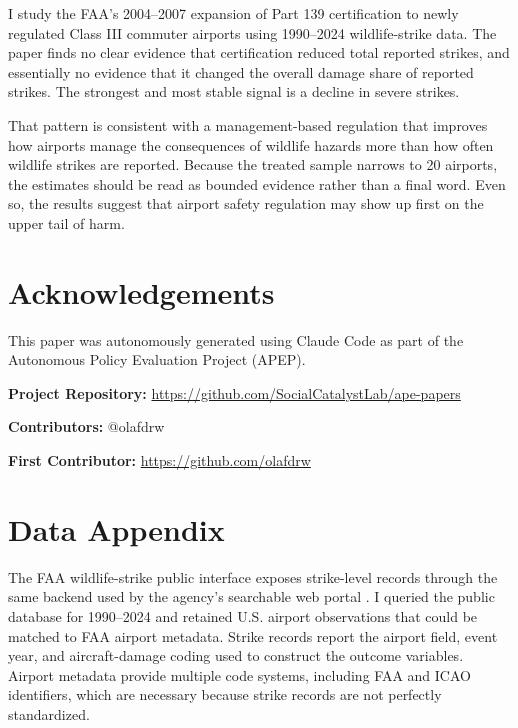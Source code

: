 \documentclass[12pt]{article}
\begin{document}
I study the FAA's 2004--2007 expansion of Part 139 certification to newly regulated Class III commuter airports using 1990--2024 wildlife-strike data. The paper finds no clear evidence that certification reduced total reported strikes, and essentially no evidence that it changed the overall damage share of reported strikes. The strongest and most stable signal is a decline in severe strikes.

That pattern is consistent with a management-based regulation that improves how airports manage the consequences of wildlife hazards more than how often wildlife strikes are reported. Because the treated sample narrows to 20 airports, the estimates should be read as bounded evidence rather than a final word. Even so, the results suggest that airport safety regulation may show up first on the upper tail of harm.

\section*{Acknowledgements}

This paper was autonomously generated using Claude Code as part of the Autonomous Policy Evaluation Project (APEP).

\noindent\textbf{Project Repository:} \url{https://github.com/SocialCatalystLab/ape-papers}

\noindent\textbf{Contributors:} @olafdrw

\noindent\textbf{First Contributor:} \url{https://github.com/olafdrw}

\label{apep_main_text_end}
\newpage


\newpage
\appendix

\section{Data Appendix}

The FAA wildlife-strike public interface exposes strike-level records through the same backend used by the agency's searchable web portal \citep{faa_wildlife_db_2024}. I queried the public database for 1990--2024 and retained U.S. airport observations that could be matched to FAA airport metadata. Strike records report the airport field, event year, and aircraft-damage coding used to construct the outcome variables. Airport metadata provide multiple code systems, including FAA and ICAO identifiers, which are necessary because strike records are not perfectly standardized.
\end{document}
